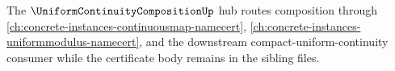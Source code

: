 The $\UniformContinuityCompositionUp$ hub routes composition through \autoref{ch:concrete-instances-continuousmap-namecert}, \autoref{ch:concrete-instances-uniformmodulus-namecert}, and the downstream compact-uniform-continuity consumer while the certificate body remains in the sibling files.



